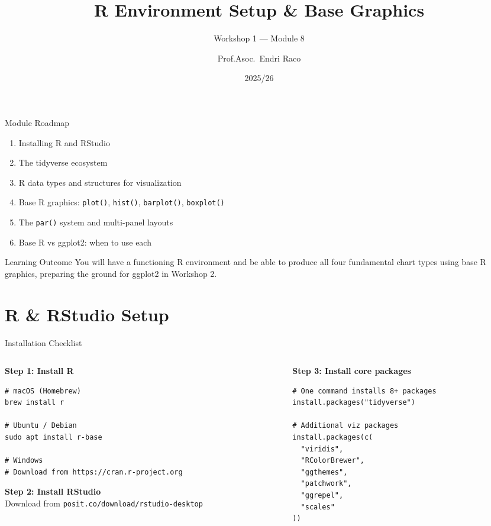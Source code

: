 \documentclass[10pt]{beamer}
\title{R Environment Setup \& Base Graphics}
\subtitle{Workshop 1 --- Module 8}
\author{Prof.Asoc.\ Endri Raco}
\institute{Data Visualization for Data Scientists \\ UNYT Tirana}
\date{2025/26}
\begin{document}
\begin{frame}
  \titlepage
\end{frame}

\begin{frame}{Module Roadmap}
  \begin{enumerate}
    \item Installing R and RStudio
    \item The tidyverse ecosystem
    \item R data types and structures for visualization
    \item Base R graphics: \texttt{plot()}, \texttt{hist()}, \texttt{barplot()}, \texttt{boxplot()}
    \item The \texttt{par()} system and multi-panel layouts
    \item Base R vs ggplot2: when to use each
  \end{enumerate}
  \begin{exampleblock}{Learning Outcome}
    You will have a functioning R environment and be able to produce
    all four fundamental chart types using base R graphics, preparing
    the ground for ggplot2 in Workshop 2.
  \end{exampleblock}
\end{frame}

\section{R \& RStudio Setup}

\begin{frame}[fragile]{Installation Checklist}
  \begin{columns}[T]
    \begin{column}{0.48\textwidth}
      \textbf{Step 1: Install R}
\begin{lstlisting}[style=bashstyle]
# macOS (Homebrew)
brew install r

# Ubuntu / Debian
sudo apt install r-base

# Windows
# Download from https://cran.r-project.org
\end{lstlisting}
      \vspace{4pt}
      \textbf{Step 2: Install RStudio}\\
      {\small Download from \texttt{posit.co/download/rstudio-desktop}}
    \end{column}
    \begin{column}{0.48\textwidth}
      \textbf{Step 3: Install core packages}
\begin{lstlisting}[style=rstyle]
# One command installs 8+ packages
install.packages("tidyverse")

# Additional viz packages
install.packages(c(
  "viridis",
  "RColorBrewer",
  "ggthemes",
  "patchwork",
  "ggrepel",
  "scales"
))
\end{lstlisting}
    \end{column}
  \end{columns}
\end{frame}
\end{document}
